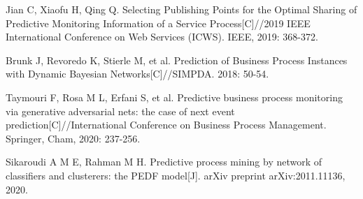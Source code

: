 \documentclass[runningheads]{llncs}
\begin{document}
\begin{thebibliography}{99}
	Jian C, Xiaofu H, Qing Q. Selecting Publishing Points for the Optimal Sharing of Predictive Monitoring Information of a Service Process[C]//2019 IEEE International Conference on Web Services (ICWS). IEEE, 2019: 368-372.
	
	Brunk J, Revoredo K, Stierle M, et al. Prediction of Business Process Instances with Dynamic Bayesian Networks[C]//SIMPDA. 2018: 50-54.
	
	Taymouri F, Rosa M L, Erfani S, et al. Predictive business process monitoring via generative adversarial nets: the case of next event prediction[C]//International Conference on Business Process Management. Springer, Cham, 2020: 237-256.
	
	Sikaroudi A M E, Rahman M H. Predictive process mining by network of classifiers and clusterers: the PEDF model[J]. arXiv preprint arXiv:2011.11136, 2020.
		
	\end{thebibliography}

	
\end{document}

